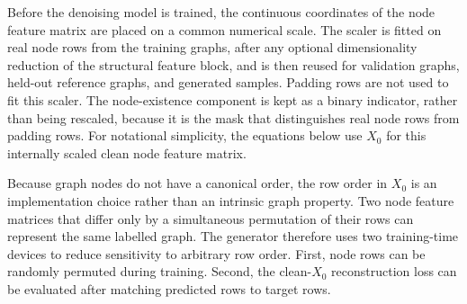 Before the denoising model is trained, the continuous coordinates of the node
feature matrix are placed on a common numerical scale. The scaler is fitted on
real node rows from the training graphs, after any optional dimensionality
reduction of the structural feature block, and is then reused for validation
graphs, held-out reference graphs, and generated samples. Padding rows are not
used to fit this scaler. The node-existence component is kept as a binary indicator, rather
than being rescaled, because it is the mask that distinguishes real node rows
from padding rows. For notational simplicity, the equations below use \(X_0\)
for this internally scaled clean node feature matrix.

Because graph nodes do not have a canonical order, the row order in \(X_0\) is
an implementation choice rather than an intrinsic graph property. Two node
feature matrices that differ only by a simultaneous permutation of their rows
can represent the same labelled graph. The generator therefore uses two
training-time devices to reduce sensitivity to arbitrary row order. First, node
rows can be randomly permuted during training. Second, the clean-\(X_0\)
reconstruction loss can be evaluated after matching predicted rows to target
rows.

